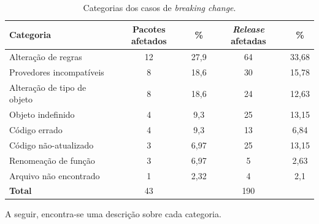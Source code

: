 \begin{table}[]
\begin{tabular}{|l|c|c|c|c|}
\hline
\centering
\textbf{Categoria}           & \textbf{Pacotes afetados} & \textbf{\%}   & \textbf{\textit{Release} afetadas} & \textbf{\%}    \\ \hline
Alteração de regras          & 12              & 27,9 & 64                          & 33,68 \\
Provedores incompatíveis     & 8               & 18,6 & 30                          & 15,78 \\
Alteração de tipo de objeto  & 8               & 18,6 & 24                          & 12,63 \\
Objeto indefinido            & 4               & 9,3  & 25                          & 13,15 \\
Código errado                & 4               & 9,3  & 13                          & 6,84  \\
Código não-atualizado        & 3               & 6,97 & 25                          & 13,15  \\
Renomeação de função         & 3               & 6,97 & 5                           & 2,63  \\
Arquivo não encontrado       & 1               & 2,32 & 4                           & 2,1  \\ \hline
\textbf{Total}               & 43              &      & 190                         &       \\ \hline
\end{tabular}
\caption{Categorias dos casos de \textit{breaking change}.}
\label{tab:bc_category}
\end{table}

A seguir, encontra-se uma descrição sobre cada categoria.

